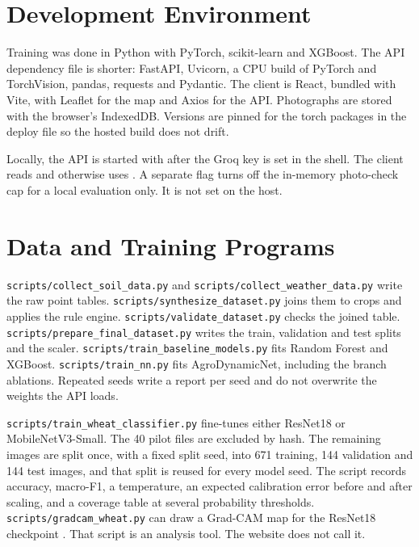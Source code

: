 \label{ch:impl}

\section{Development Environment}
Training was done in Python with PyTorch, scikit-learn and XGBoost. The API dependency file is shorter: FastAPI, Uvicorn, a CPU build of PyTorch and TorchVision, pandas, requests and Pydantic. The client is React, bundled with Vite, with Leaflet for the map and Axios for the API. Photographs are stored with the browser's IndexedDB. Versions are pinned for the torch packages in the deploy file so the hosted build does not drift.

Locally, the API is started with  after the Groq key is set in the shell. The client reads  and otherwise uses . A separate flag turns off the in-memory photo-check cap for a local evaluation only. It is not set on the host.

\section{Data and Training Programs}
\texttt{scripts/collect\_soil\_data.py} and \texttt{scripts/collect\_weather\_data.py} write the raw point tables. \texttt{scripts/synthesize\_dataset.py} joins them to crops and applies the rule engine. \texttt{scripts/validate\_dataset.py} checks the joined table. \texttt{scripts/prepare\_final\_dataset.py} writes the train, validation and test splits and the scaler. \texttt{scripts/train\_baseline\_models.py} fits Random Forest and XGBoost. \texttt{scripts/train\_nn.py} fits AgroDynamicNet, including the branch ablations. Repeated seeds write a report per seed and do not overwrite the weights the API loads.

\texttt{scripts/train\_wheat\_classifier.py} fine-tunes either ResNet18 or MobileNetV3-Small. The 40 pilot files are excluded by hash. The remaining images are split once, with a fixed split seed, into 671 training, 144 validation and 144 test images, and that split is reused for every model seed. The script records accuracy, macro-F1, a temperature, an expected calibration error before and after scaling, and a coverage table at several probability thresholds. \texttt{scripts/gradcam\_wheat.py} can draw a Grad-CAM map for the ResNet18 checkpoint \cite{selvaraju2017gradcam}. That script is an analysis tool. The website does not call it.

